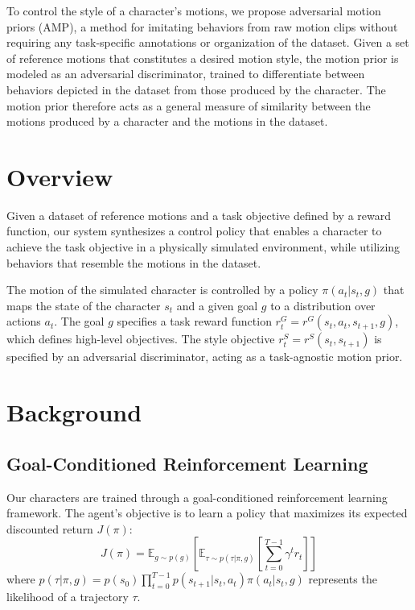 \documentclass[acmtog]{acmart}
\begin{document}
To control the style of a character's motions, we propose adversarial motion priors (AMP), a method for imitating behaviors from raw motion clips without requiring any task-specific annotations or organization of the dataset. Given a set of reference motions that constitutes a desired motion style, the motion prior is modeled as an adversarial discriminator, trained to differentiate between behaviors depicted in the dataset from those produced by the character. The motion prior therefore acts as a general measure of similarity between the motions produced by a character and the motions in the dataset.

\section{Overview}
Given a dataset of reference motions and a task objective defined by a reward function, our system synthesizes a control policy that enables a character to achieve the task objective in a physically simulated environment, while utilizing behaviors that resemble the motions in the dataset.

The motion of the simulated character is controlled by a policy $\pi(a_t|s_t,g)$ that maps the state of the character $s_t$ and a given goal $g$ to a distribution over actions $a_t$. The goal $g$ specifies a task reward function $r_t^G = r^G(s_t, a_t, s_{t+1}, g)$, which defines high-level objectives. The style objective $r_t^S = r^S(s_t, s_{t+1})$ is specified by an adversarial discriminator, acting as a task-agnostic motion prior.

\section{Background}

\subsection{Goal-Conditioned Reinforcement Learning}
Our characters are trained through a goal-conditioned reinforcement learning framework. The agent's objective is to learn a policy that maximizes its expected discounted return $J(\pi)$:
\begin{equation}
    J(\pi) = \mathbb{E}_{g \sim p(g)} \left[ \mathbb{E}_{\tau \sim p(\tau|\pi, g)} \left[ \sum_{t=0}^{T-1} \gamma^t r_t \right] \right]
\end{equation}
where $p(\tau|\pi, g) = p(s_0) \prod_{t=0}^{T-1} p(s_{t+1}|s_t, a_t) \pi(a_t|s_t, g)$ represents the likelihood of a trajectory $\tau$.
\end{document}
